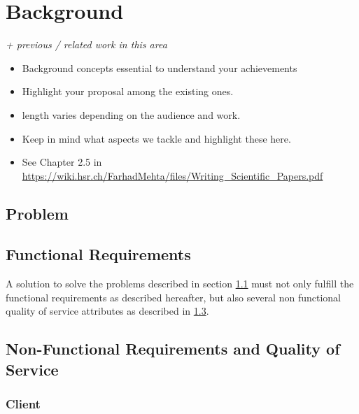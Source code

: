 \chapter{Background}
\label{sec:background}

\textit{+ previous / related work in this area}
\begin{itemize}
    \item Background concepts essential to understand your achievements
    \item Highlight your proposal among the existing ones.
    \item length varies depending on the audience and work.
    \item Keep in mind what aspects we tackle and highlight these here.
    \item See Chapter 2.5 in \url{https://wiki.hsr.ch/FarhadMehta/files/Writing_Scientific_Papers.pdf}
\end{itemize}

\section{Problem}\label{sec:problem}


\section{Functional Requirements}

A solution to solve the problems described in section \ref{sec:problem} must not only fulfill the functional requirements as described hereafter, but also several non functional quality of service attributes as described in \ref{sec:non-functional-requirements}.


\section{Non-Functional Requirements and Quality of Service}\label{sec:non-functional-requirements}

\subsection{Client}

